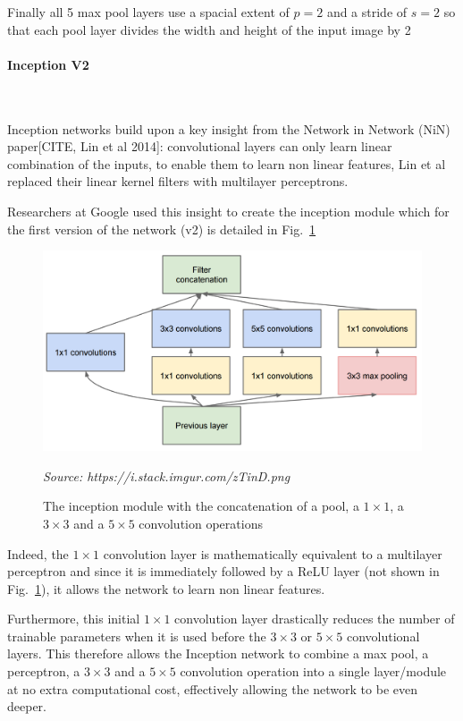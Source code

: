 \documentclass[12pt,twoside]{article}
\newcommand{\source}[1]{\vspace{-3pt} \caption*{ \footnotesize{\textit{Source: {#1}}}} }
\newcommand{\para}[1]{\paragraph{#1}\mbox{}\\}
\begin{document}
Finally all 5 max pool layers use a spacial extent of $p=2$ and a stride of
$s=2$ so that each pool layer divides the width and height of the input image
by 2 
 
\para{Inception V2}\label{para:inception_v2}

Inception networks build upon a key insight from the Network in Network
(NiN) paper[CITE, Lin et al 2014]: convolutional layers can only learn linear
combination of the inputs, to enable them to learn non linear
features, Lin et al replaced their linear kernel filters with multilayer
perceptrons. 

Researchers at Google used this insight to create the inception
module which for the first version of the network (v2) is detailed in
Fig.~\ref{fig:inception_module}

\begin{figure}[ht]
  \centering
  \includegraphics[scale=0.3]{figures/inception_module.png}
  \caption{The inception module with the concatenation of a pool, a $1 \times
  1$, a $3 \times 3$ and a $5 \times 5$ convolution operations}
  \source{https://i.stack.imgur.com/zTinD.png}
  \label{fig:inception_module}
\end{figure}

Indeed, the $1\times 1$ convolution layer is mathematically equivalent to a
multilayer perceptron and since it is immediately followed by a ReLU layer
(not shown in Fig.~\ref{fig:inception_module}), it allows the network to learn
non linear features. 

Furthermore, this initial $1 \times 1$ convolution layer drastically reduces
the number of trainable parameters when it is used before the $3 \times 3$ or
$5 \times 5$ convolutional layers. This therefore allows the Inception network to
combine a max pool, a perceptron, a $3 \times 3$ and a $5 \times 5$ convolution
operation into a single layer/module at no extra computational cost,
effectively allowing the network to be even deeper.
\end{document}
